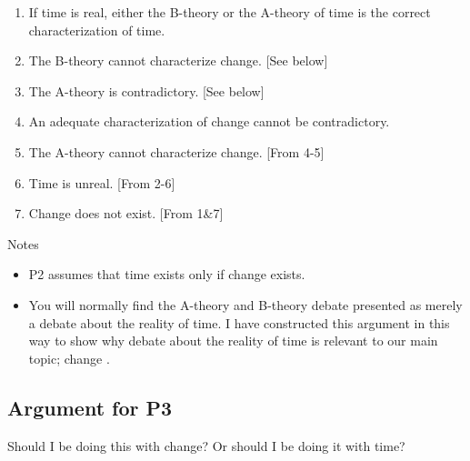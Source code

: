 \documentclass[oneside]{article}
\begin{document}
\begin{enumerate}
\item If time is real, either the B-theory or the A-theory of time is the correct characterization of time. 
\item The B-theory cannot characterize change. [See below]
\item The A-theory is contradictory. [See below]
\item An adequate characterization of change cannot be contradictory. 
\item The A-theory cannot characterize change. [From 4-5] 
\item Time is unreal. [From 2-6]
\item Change does not exist. [From 1\&7]
\end{enumerate}
Notes
\begin{itemize}
\item  P2 assumes that time exists only if change exists. 
\item  You will normally find the A-theory and B-theory debate presented as merely a debate about the reality of time. I have constructed this argument in this way to show why debate about the reality of time is relevant to our main topic; change .
\end{itemize}

\subsection*{Argument for P3}
Should I be doing this with change? Or should I be doing it with time? 
\end{document}
